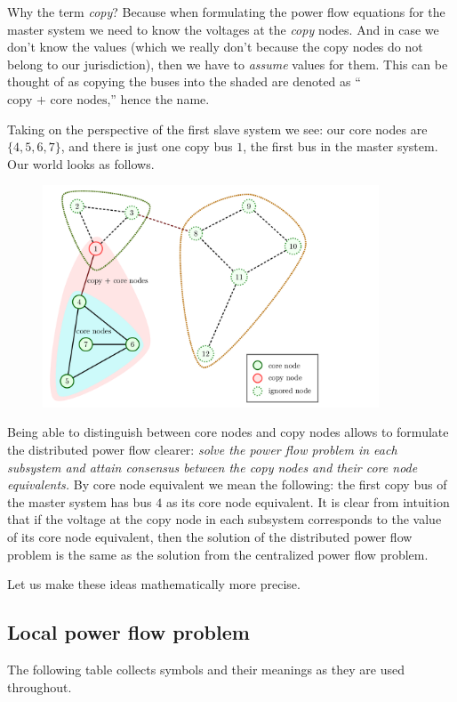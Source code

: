 \documentclass{article}
\begin{document}
Why the term \emph{copy}?
Because when formulating the power flow equations for the master system we need to know the voltages at the \emph{copy} nodes.
And in case we don't know the values (which we really don't because the copy nodes do not belong to our jurisdiction), then we have to \emph{assume} values for them.
This can be thought of as copying the buses into the shaded are denoted as ``$\text{copy + core nodes}$,'' hence the name.

Taking on the perspective of the first slave system we see: our core nodes are $\{ 4, 5, 6, 7 \}$, and there is just one copy bus $1$, the first bus in the master system.
Our world looks as follows.

\begin{figure}
    \includegraphics[width=10cm]{visualization/version_2.png}
\end{figure}

Being able to distinguish between core nodes and copy nodes allows to formulate the distributed power flow clearer: \emph{solve the power flow problem in each subsystem and attain consensus between the copy nodes and their core node equivalents.}
By core node equivalent we mean the following: the first copy bus of the master system has bus $4$ as its core node equivalent.
It is clear from intuition that if the voltage at the copy node in each subsystem corresponds to the value of its core node equivalent, then the solution of the distributed power flow problem is the same as the solution from the centralized power flow problem.

Let us make these ideas mathematically more precise.

\subsection{Local power flow problem}

The following table collects symbols and their meanings as they are used throughout.
\end{document}
